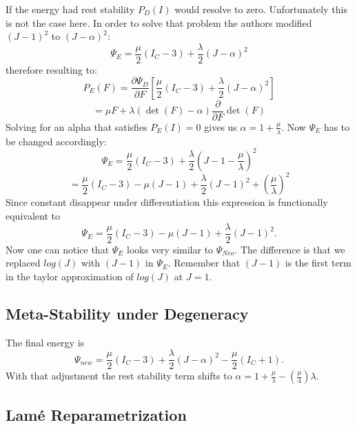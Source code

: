 If the energy had rest stability $P_{D}(I)$ would resolve to zero. Unfortunately this is not the case here. In order to solve that problem the authors modified $(J-1)^{2}$ to $(J-\alpha)^{2}$:
\[
\Psi_{E} = \frac{\mu}{2}\left(I_{C}-3\right) +\frac{\lambda}{2}(J-\alpha)^{2}
\]
therefore resulting to:
\[
P_{E}(F) = \frac{\partial \Psi_{D}}{\partial F} \left[ \frac{\mu}{2}\left(I_{C}-3\right) +\frac{\lambda}{2}(J-\alpha)^{2} \right]
\]
\[
= \mu F + \lambda (\operatorname{det}(F)-\alpha)  \frac{\partial}{\partial F} \operatorname{det}(F)
\]
Solving for an alpha that satisfies $P_{E}(I)=0$ gives us $\alpha=1+\frac{\mu}{\lambda}$. Now $\Psi_{E}$ has to be changed accordingly:
\[
\Psi_{E} = \frac{\mu}{2}\left(I_{C}-3\right) +\frac{\lambda}{2}(J-1-\frac{\mu}{\lambda})^{2}
\]
\[
= \frac{\mu}{2}\left(I_{C}-3\right) - \mu\left(J-1\right) + \frac{\lambda}{2}(J-1)^{2} + \left(\frac{\mu}{\lambda}\right)^{2}
\]
Since constant disappear under differentiation this expression is functionally equivalent to 
\[
\Psi_{E} = \frac{\mu}{2}\left(I_{C}-3\right) - \mu\left(J-1\right) + \frac{\lambda}{2}(J-1)^{2}.
\]
Now one can notice that $\Psi_{E}$ looks very similar to $\Psi_{Neo}$. The difference is that we replaced $log(J)$ with $(J-1)$ in $\Psi_{E}$. Remember that $(J-1)$ is the first term in the taylor approximation of $log(J)$ at $J=1$.


\subsection{Meta-Stability under Degeneracy}
The final energy is
\begin{equation}\label{eq:stable_energy}
\Psi_{new} = \frac{\mu}{2}\left(I_{C}-3\right) + \frac{\lambda}{2}(J-\alpha)^{2} - \frac{\mu}{2}\left(I_{C}+1\right).
\end{equation}
With that adjustment the rest stability term shifts to $\alpha=1+\frac{\mu}{\lambda}-\left(\frac{\mu}{4}\right)\lambda$.


\subsection{Lamé Reparametrization}


